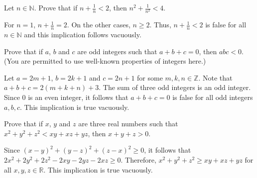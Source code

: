 \documentclass[12pt]{article}
\newcommand{\N}{\mathbb{N}}
\newcommand{\Z}{\mathbb{Z}}
\newcommand{\R}{\mathbb{R}}
\newenvironment{problem}[2][Problem]{\begin{trivlist}
		\item[\hskip \labelsep {\bfseries #1}\hskip \labelsep {\bfseries #2.}]}{\end{trivlist}}
\newenvironment{solution}[2][Solution]{\begin{trivlist}
		\item[\hskip \labelsep {\bfseries #1}\hskip \labelsep {\bfseries #2.}]}{\end{trivlist}}
\begin{document}
 	\begin{problem}{5}
 		Let $n \in \N$. Prove that if $n+\frac{1}{n}<2$, then $n^{2}+\frac{1}{n^{2}}<4$.
 		\begin{solution}{}
 			For $n=1$, $n+\frac{1}{n}=2$. On the other cases, $n\geq 2$. Thus, $n+\frac{1}{n}<2$ is false for all $n \in \N$ and this implication follows vacuously.
 		\end{solution}
 	\end{problem}
 
 	\begin{problem}{6}
 		Prove that if $a$, $b$ and $c$ are odd integers such that $a+b+c=0$, then $abc<0$. (You are permitted to use well-known properties of integers here.)
 		\begin{solution}{}
 			Let $a=2m+1$, $b=2k+1$ and $c=2n+1$ for some $m,k,n\in \Z$. Note that $a+b+c = 2(m+k+n)+3$. The sum of three odd integers is an odd integer. Since $0$ is an even integer, it follows that $a+b+c=0$ is false for all odd integers $a,b,c$. This implication is true vacuously.
 		\end{solution} 
 	\end{problem}
 
 	\begin{problem}{7}
 		Prove that if $x$, $y$ and $z$ are three real numbers such that $x^{2}+y^{2}+z^{2}<xy+xz+yz$, then $x+y+z>0$.
 		\begin{solution}{}
 			Since $(x-y)^{2}+(y-z)^{2}+(z-x)^{2} \geq 0$, it follows that $2x^{2}+2y^{2}+2z^{2} - 2xy - 2yz - 2xz\geq 0$. Therefore, $x^{2}+y^{2}+z^{2}\geq xy+xz+yz$ for all $x,y,z \in \R$. This implication is true vacuously.
 		\end{solution}
 	\end{problem}
\end{document}
